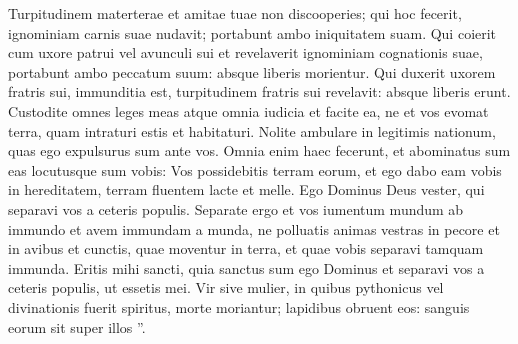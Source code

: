 \begin{biblechapter}
\begin{biblechapter}
\begin{biblechapter}
\begin{biblechapter}
\begin{biblechapter}
\begin{biblechapter}
\begin{biblechapter}
\begin{biblechapter}
\begin{biblechapter}
\begin{biblechapter}
\begin{biblechapter}
\begin{biblechapter}
\begin{biblechapter}
\begin{biblechapter}
\begin{biblechapter}
\begin{biblechapter}
\begin{biblechapter}
\begin{biblechapter}
\begin{biblechapter}
\begin{biblechapter}
 \verse Turpitudinem materterae et amitae tuae non discooperies; qui hoc fecerit, ignominiam carnis suae nudavit; portabunt ambo iniquitatem suam.
 \verse Qui coierit cum uxore patrui vel avunculi sui et revelaverit ignominiam cognationis suae, portabunt ambo peccatum suum: absque liberis morientur.
 \verse Qui duxerit uxorem fratris sui, immunditia est, turpitudinem fratris sui revelavit: absque liberis erunt.
 \verse Custodite omnes leges meas atque omnia iudicia et facite ea, ne et vos evomat terra, quam intraturi estis et habitaturi. 
\verse Nolite ambulare in legitimis nationum, quas ego expulsurus sum ante vos. Omnia enim haec fecerunt, et abominatus sum eas 
\verse locutusque sum vobis: Vos possidebitis terram eorum, et ego dabo eam vobis in hereditatem, terram fluentem lacte et melle. Ego Dominus Deus vester, qui separavi vos a ceteris populis.
 \verse Separate ergo et vos iumentum mundum ab immundo et avem immundam a munda, ne polluatis animas vestras in pecore et in avibus et cunctis, quae moventur in terra, et quae vobis separavi tamquam immunda. 
\verse Eritis mihi sancti, quia sanctus sum ego Dominus et separavi vos a ceteris populis, ut essetis mei.
 \verse Vir sive mulier, in quibus pythonicus vel divinationis fuerit spiritus, morte moriantur; lapidibus obruent eos: sanguis eorum sit super illos ”.
 

\end{biblechapter}
\end{biblechapter}
\end{biblechapter}
\end{biblechapter}
\end{biblechapter}
\end{biblechapter}
\end{biblechapter}
\end{biblechapter}
\end{biblechapter}
\end{biblechapter}
\end{biblechapter}
\end{biblechapter}
\end{biblechapter}
\end{biblechapter}
\end{biblechapter}
\end{biblechapter}
\end{biblechapter}
\end{biblechapter}
\end{biblechapter}
\end{biblechapter}
